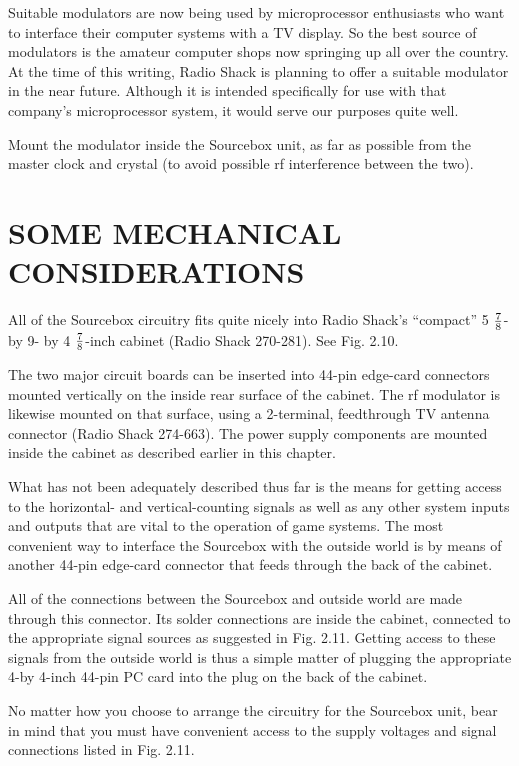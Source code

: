 \documentclass[11pt]{book}              %
\begin{document}
Suitable modulators are now being used by microprocessor enthusiasts who want to interface their computer systems with a TV display. So the best source of modulators is the amateur computer shops now springing up all over the country. At the time of this writing, Radio Shack is planning to offer a suitable modulator in the near future. Although it is intended specifically for use with that company’s microprocessor system, it would serve our purposes quite well.

Mount the modulator inside the Sourcebox unit, as far as possible from the master clock and crystal (to avoid possible rf interference between the two).

\section{SOME MECHANICAL CONSIDERATIONS}

All of the Sourcebox circuitry fits quite nicely into Radio Shack’s “compact” 5 $7\over{8}$-by 9- by 4 $7\over{8}$-inch cabinet (Radio Shack 270-281). See Fig. 2.10.

The two major circuit boards can be inserted into 44-pin edge-card connectors mounted vertically on the inside rear surface of the cabinet. The rf modulator is likewise mounted on that surface, using a 2-terminal, feedthrough TV antenna connector (Radio Shack 274-663). The power supply components are mounted inside the cabinet as described earlier in this chapter.

What has not been adequately described thus far is the means for getting access to the horizontal- and vertical-counting signals as well as any other system inputs and outputs that are vital to the operation of game systems. The most convenient way to interface the Sourcebox with the outside world is by means of another 44-pin edge-card connector that feeds through the back of the cabinet.

All of the connections between the Sourcebox and outside world are made through this connector. Its solder connections are inside the cabinet, connected to the appropriate signal sources as suggested in Fig. 2.11. Getting access to these signals from the outside world is thus a simple matter of plugging the appropriate 4-by 4-inch 44-pin PC card into the plug on the back of the cabinet.

No matter how you choose to arrange the circuitry for the Sourcebox unit, bear in mind that you must have convenient access to the supply voltages and signal connections listed in Fig. 2.11.
\end{document}
